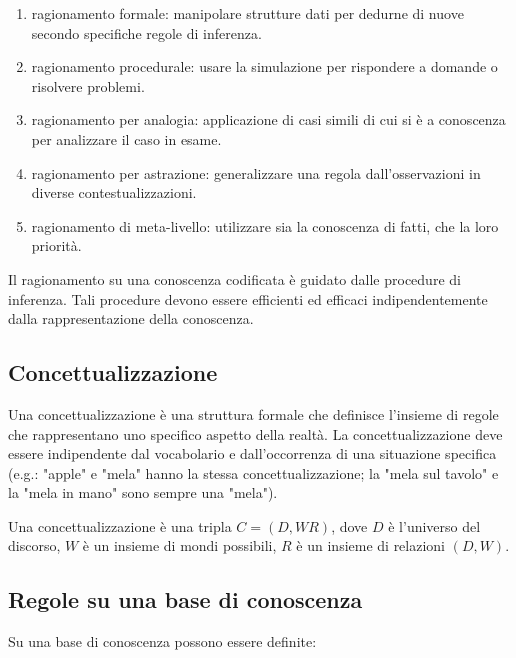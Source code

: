 \begin{enumerate}
	
	\item ragionamento formale: manipolare strutture dati per dedurne di nuove secondo specifiche regole di inferenza.
	
	\item ragionamento procedurale: usare la simulazione per rispondere a domande o risolvere problemi.
	
	\item ragionamento per analogia: applicazione di casi simili di cui si è a conoscenza per analizzare il caso in esame.
	
	\item ragionamento per astrazione: generalizzare una regola dall'osservazioni in diverse contestualizzazioni.
	
	\item ragionamento di meta-livello: utilizzare sia la conoscenza di fatti, che la loro priorità.
\end{enumerate}

Il ragionamento su una conoscenza codificata è guidato dalle procedure di inferenza. Tali procedure devono essere efficienti ed efficaci indipendentemente dalla rappresentazione della conoscenza.

\subsection{Concettualizzazione}
Una concettualizzazione è una struttura formale che definisce l'insieme di regole che rappresentano uno specifico aspetto della realtà. La concettualizzazione deve essere indipendente dal vocabolario e dall'occorrenza di una situazione specifica (e.g.: "apple" e "mela" hanno la stessa concettualizzazione; la "mela sul tavolo" e la "mela in mano" sono sempre una "mela").

Una concettualizzazione è una tripla $C=(D,WR)$, dove $D$ è l'universo del discorso, $W$ è un insieme di mondi possibili, $R$ è un insieme di relazioni $(D,W)$.

\subsection{Regole su una base di conoscenza}
Su una base di conoscenza possono essere definite:

